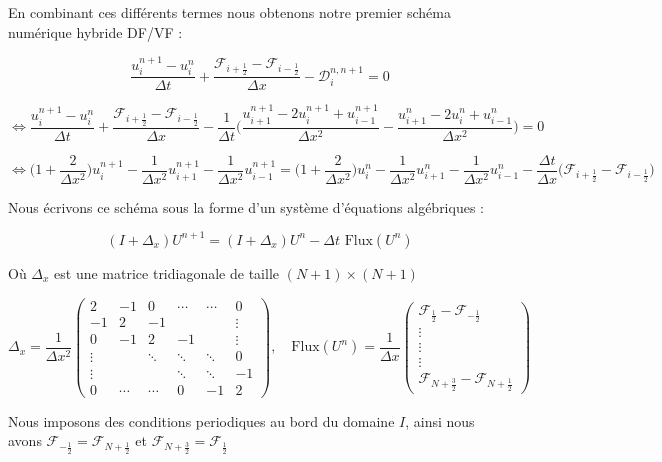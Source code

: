 En combinant ces différents termes nous obtenons notre premier schéma numérique hybride DF/VF :

$$ \frac{u_i^{n+1} - u_i^n}{\Delta t} + \frac{\mathcal{F}_{i+\frac{1}{2}} - \mathcal{F}_{i - \frac{1}{2}}}{\Delta x} - \mathcal{D}_i^{n,n+1} = 0 $$

$$\Leftrightarrow \frac{u_i^{n+1} - u_i^n}{\Delta t} + \frac{\mathcal{F}_{i+\frac{1}{2}} - \mathcal{F}_{i - \frac{1}{2}}}{\Delta x} - \frac{1}{\Delta t} \Biggl( \frac{u_{i+1}^{n+1} - 2u_i^{n+1} + u_{i-1}^{n+1}}{\Delta x^2} - \frac{u_{i+1}^{n} - 2u_i^{n} + u_{i-1}^n}{\Delta x^2}\Biggr) = 0$$

$$\Leftrightarrow \bigl( 1 + \frac{2}{\Delta x^2}\bigr)u_i^{n+1} - \frac{1}{\Delta x^2}u_{i+1}^{n+1} - \frac{1}{\Delta x^2}u_{i - 1}^{n+1} = \bigl( 1 + \frac{2}{\Delta x^2}\bigr)u_i^n - \frac{1}{\Delta x^2}u_{i+1}^n - \frac{1}{\Delta x^2}u_{i-1}^n - \frac{\Delta t}{\Delta x} \bigl(\mathcal{F}_{i+\frac{1}{2}} - \mathcal{F}_{i - \frac{1}{2}} \bigr)$$

Nous écrivons ce schéma sous la forme d'un système d'équations algébriques : 

$$(I + \Delta_x)U^{n+1} = (I + \Delta_x)U^{n} - \Delta t \text{ Flux}(U^n) $$


Où $\Delta_x$ est une matrice tridiagonale de taille $(N+1)\times(N+1)$

$$
\Delta_x = \frac{1}{\Delta x^2}
\begin{pmatrix}
    2 & -1 & 0   & \cdots & \cdots & 0 \\
   -1 & 2  & -1  & \quad & \quad & \vdots \\
    0 & -1 & 2   & -1 & \quad &\vdots \\
    \vdots & \quad & \ddots & \ddots & \ddots & 0 \\
    \vdots & \quad & \quad & \ddots & \ddots & -1 \\
    0 & \cdots & \cdots & 0 & -1 & 2
\end{pmatrix}
, \quad \text{Flux}(U^n) = \frac{1}{\Delta x}
\begin{pmatrix}
    \mathcal{F}_{\frac{1}{2}} - \mathcal{F}_{-\frac{1}{2}} \\
    \vdots \\
    \vdots \\
    \vdots \\
    \mathcal{F}_{N + \frac{3}{2}} - \mathcal{F}_{N + \frac{1}{2}}
\end{pmatrix}
$$

Nous imposons des conditions periodiques au bord du domaine $I$, ainsi nous avons $\mathcal{F}_{-\frac{1}{2}} = \mathcal{F}_{N +\frac{1}{2}}$ et $\mathcal{F}_{N + \frac{3}{2}} = \mathcal{F}_{\frac{1}{2}}$


